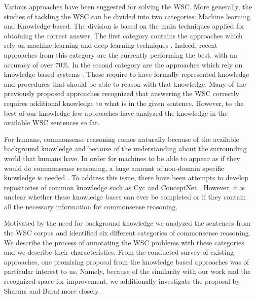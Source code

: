 Various approaches have been suggested for solving the WSC.
More generally, the studies of tackling the WSC can be divided into two categories: Machine learning and Knowledge based. 
The division is based on the main techniques applied for obtaining the correct answer. The first category contains the approaches which rely on machine learning and deep learning techniques \cite{DBLP:conf/emnlp/RahmanN12, DBLP:journals/corr/LiuJLZWH16,  DBLP:journals/corr/abs-1806-02847}. Indeed, recent approaches from this category \cite{DBLP:journals/corr/abs-1806-02847, radford2019language} are the currently performing the best, with an accuracy of over 70\%. In the second category are the approaches which rely on knowledge based systems \cite{DBLP:conf/aaai/SharmaB16,DBLP:conf/emnlp/EmamiCTSC18,DBLP:conf/kr/Schuller14}. These require to have formally represented knowledge and procedures that should be able to reason with that knowledge. Many of the previously proposed approaches \cite{DBLP:conf/ijcai/SharmaVAB15, DBLP:conf/kr/Schuller14, DBLP:journals/corr/LiuJLZWH16, DBLP:conf/emnlp/EmamiCTSC18} recognized that answering the WSC correctly requires additional knowledge to what is in the given sentence. However, to the best of our knowledge few approaches have analyzed the knowledge in the available WSC sentences so far. 

For humans, commonsense reasoning comes naturally  because of the available background knowledge and because of the understanding about the surrounding world that humans have. In order for machines to be able to appear as if they would do commonsense reasoning, a huge amount of non-domain specific knowledge is needed \cite{DBLP:journals/ibmsj/McCarthyMSGLMMRSS02}. To address this issue, there have been attempts to develop repositories of common knowledge such as Cyc \cite{DBLP:journals/cacm/Lenat95} and ConceptNet \cite{articleC}. However, it is unclear whether these knowledge bases can ever be completed or if they contain all the necessary information for commonsense reasoning. 

Motivated by the need for background knowledge we analyzed the sentences from the WSC corpus and identified six different categories of commonsense reasoning. We describe the process of annotating the WSC problems with these categories and we describe their characteristics. 
From the conducted survey of existing approaches, one promising proposal from the knowledge based approaches was of particular interest to us. Namely, because of the similarity with our work and the recognized space for improvement, we additionally investigate the proposal by Sharma and Baral \cite{2018CommonsenseKT} more closely.


